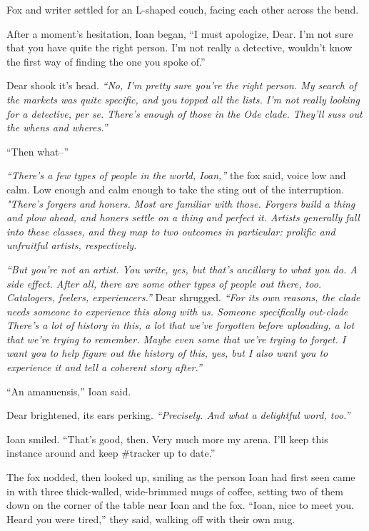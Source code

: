 Fox and writer settled for an L-shaped couch, facing each other across the bend.

After a moment's hesitation, Ioan began, ``I must apologize, Dear. I'm not sure that you have quite the right person. I'm not really a detective, wouldn't know the first way of finding the one you spoke of.''

Dear shook it's head. \emph{``No, I'm pretty sure you're the right person. My search of the markets was quite specific, and you topped all the lists. I'm not really looking for a detective, per se. There's enough of those in the Ode clade. They'll suss out the whens and wheres.''}

``Then what--''

\emph{``There's a few types of people in the world, Ioan,''} the fox said, voice low and calm. Low enough and calm enough to take the sting out of the interruption. \emph{"There's forgers and honers. Most are familiar with those. Forgers build a thing and plow ahead, and honers settle on a thing and perfect it. Artists generally fall into these classes, and they map to two outcomes in particular: prolific and unfruitful artists, respectively.}

\emph{``But you're not an artist. You write, yes, but that's ancillary to what you do. A side effect. After all, there are some other types of people out there, too. Catalogers, feelers, experiencers.''} Dear shrugged. \emph{``For its own reasons, the clade needs someone to experience this along with us. Someone specifically out-clade There's a lot of history in this, a lot that we've forgotten before uploading, a lot that we're trying to remember. Maybe even some that we're trying to forget. I want you to help figure out the history of this, yes, but I also want you to experience it and tell a coherent story after.''}

``An amanuensis,'' Ioan said.

Dear brightened, its ears perking. \emph{``Precisely. And what a delightful word, too.''}

Ioan smiled. ``That's good, then. Very much more my arena. I'll keep this instance around and keep \#tracker up to date.''

The fox nodded, then looked up, smiling as the person Ioan had first seen came in with three thick-walled, wide-brimmed mugs of coffee, setting two of them down on the corner of the table near Ioan and the fox. ``Ioan, nice to meet you. Heard you were tired,'' they said, walking off with their own mug.

